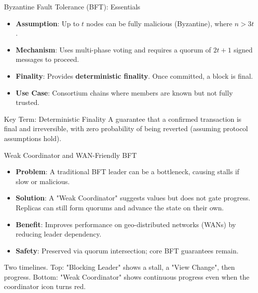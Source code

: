 \documentclass[aspectratio=169]{beamer}
\newcommand{\placeholdergraphic}[2][\linewidth]{%
  \begin{tcolorbox}[
    enhanced, colback=white, colframe=usmagray,
    title=Graphic placeholder, width=#1, sharp corners,
    boxrule=0.5pt, left=4pt,right=4pt,top=6pt,bottom=6pt
  ]
    \footnotesize #2
  \end{tcolorbox}
}
\begin{document}
\begin{frame}{Byzantine Fault Tolerance (BFT): Essentials}
    \begin{itemize}
        \item \textbf{Assumption}: Up to $t$ nodes can be fully malicious (Byzantine), where $n > 3t$ \cite{castro_practical_1999}.
        \item \textbf{Mechanism}: Uses multi-phase voting and requires a quorum of $2t+1$ signed messages to proceed.
        \item \textbf{Finality}: Provides \textbf{deterministic finality}. Once committed, a block is final.
        \item \textbf{Use Case}: Consortium chains where members are known but not fully trusted.
    \end{itemize}
    \vfill
    \begin{keytermbox}{Key Term: Deterministic Finality}
    \small A guarantee that a confirmed transaction is final and irreversible, with zero probability of being reverted (assuming protocol assumptions hold).
    \end{keytermbox}
\end{frame}

\begin{frame}{Weak Coordinator and WAN-Friendly BFT}
    \begin{itemize}
        \item \textbf{Problem}: A traditional BFT leader can be a bottleneck, causing stalls if slow or malicious.
        \item \textbf{Solution}: A "Weak Coordinator" suggests values but does not gate progress. Replicas can still form quorums and advance the state on their own.
        \item \textbf{Benefit}: Improves performance on geo-distributed networks (WANs) by reducing leader dependency.
        \item \textbf{Safety}: Preserved via quorum intersection; core BFT guarantees remain.
    \end{itemize}
    \vfill
    \placeholdergraphic{Two timelines. Top: "Blocking Leader" shows a stall, a "View Change", then progress. Bottom: "Weak Coordinator" shows continuous progress even when the coordinator icon turns red.}
\end{frame}
\end{document}
